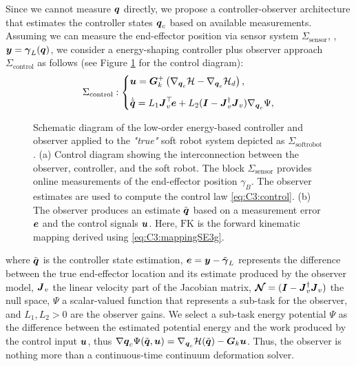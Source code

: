 Since we cannot measure ${\boldsymbol{q}}$ directly, we propose a controller-observer architecture that estimates the controller states ${\boldsymbol{q}}_c$ based on available measurements. Assuming we can measure the end-effector position via sensor system $\Sigma_{\textrm{sensor}}$, \ie, ${\boldsymbol{y}} = {\boldsymbol{\gamma}}_L({\boldsymbol{q}})$, we consider a energy-shaping controller plus observer approach $\Sigma_{\textrm{control}}$ as follows (see Figure \ref{fig:C3:diagram_control} for the control diagram):
\begin{align}
  \Sigma_{\textrm{control}}:
  \begin{dcases}
    \vspace{2mm}
    \uB  = \GB_k^+ \left( \nabla_{\vec{q}_c}{\Hm} - \nabla_{\vec{q}_c}{\Hm}_d \right), \\ 
    \dot{\tilde{\qB}} = L_1 \JB_v^\top\!\eB + L_2 (\IB - \JB_v^\dag\JB_v) \nabla_{\q_c} \Psi,
  \end{dcases}
\end{align}
%
%
\begin{figure}[!t]
  \centering
  
  \vspace{-2mm}
  \caption{\small Schematic diagram of the low-order energy-based controller and observer applied to the \textit{"true"} soft robot system depicted as $\Sigma_{\textrm{softrobot}}$. (a) Control diagram showing the interconnection between the observer, controller, and the soft robot. The block $\Sigma_{\textrm{sensor}}$ provides online measurements of the end-effector position $\gamma_B$. The observer estimates are used to compute the control law \eqref{eq:C3:control}. (b) The observer produces an estimate $\tilde{{\boldsymbol{q}}}$ based on a measurement error ${\boldsymbol{e}}$ and the control signals ${\boldsymbol{u}}$. Here, $\textrm{FK}$ is the forward kinematic mapping derived using \eqref{eq:C3:mappingSE3g}.}
  \label{fig:C3:diagram_control}
  \vspace{-3mm}
\end{figure}
%
where $\tilde{{\boldsymbol{q}}}$ is the controller state estimation, ${\boldsymbol{e}} = {\boldsymbol{y}} - \tilde{{\boldsymbol{\gamma}}}_L$ represents the difference between the true end-effector location and its estimate produced by the observer model, ${\boldsymbol{J}}_v$ the linear velocity part of the Jacobian matrix, $\boldsymbol{\mathcal{N}} = ({\boldsymbol{I}} - {\boldsymbol{J}}_v^\dag{\boldsymbol{J}}_v)$ the null space, $\Psi$ a scalar-valued function that represents a sub-task for the observer, and $L_1,L_2 > 0$ are the observer gains. We select a sub-task energy potential $\Psi$ as the difference between the estimated potential energy and the work produced by the control input ${\boldsymbol{u}}$, thus $\nabla{{\boldsymbol{q}}_c} \Psi(\tilde{{\boldsymbol{q}}},{\boldsymbol{u}}) = \nabla_{{\boldsymbol{q}}_c}\mathcal{H}(\tilde{{\boldsymbol{q}}}) - {\boldsymbol{G}}_k {\boldsymbol{u}}$. Thus, the observer is nothing more than a continuous-time continuum deformation solver.%
